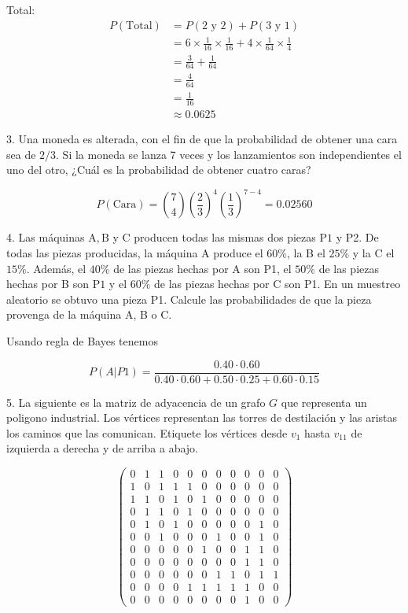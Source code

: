 \documentclass{report}
\begin{document}
Total:
\begin{align*}
    P(\text{Total}) &= P(\text{2 y 2}) + P(\text{3 y 1}) \\
    &= 6 \times \frac{1}{16} \times \frac{1}{16} + 4 \times \frac{1}{64} \times \frac{1}{4} \\
    &= \frac{3}{64} + \frac{1}{64} \\
    &= \frac{4}{64} \\
    &= \frac{1}{16} \\
    &\approx 0.0625
\end{align*}
    

3. Una moneda es alterada, con el fin de que la probabilidad de obtener una cara sea de $2 / 3$. Si la moneda se lanza 7 veces y los lanzamientos son independientes el uno del otro, ¿Cuál es la probabilidad de obtener cuatro caras?

$$P(\text{Cara}) = \binom{7}{4} \left(\frac{2}{3}\right)^4 \left(\frac{1}{3}\right)^{7-4} = 0.02560$$

4. Las máquinas $\mathrm{A}, \mathrm{B}$ y $\mathrm{C}$ producen todas las mismas dos piezas $\mathrm{P} 1$ y P2. De todas las piezas producidas, la máquina A produce el $60 \%$, la B el $25 \%$ y la C el $15 \%$. Además, el $40 \%$ de las piezas hechas por A son P1, el $50 \%$ de las piezas hechas por B son $\mathrm{P} 1$ y el $60 \%$ de las piezas hechas por C son P1. En un muestreo aleatorio se obtuvo una pieza P1. Calcule las probabilidades de que la pieza provenga de la máquina A, B o C.

Usando regla de Bayes tenemos

$$P(A|P1) = \frac{0.40 \cdot 0.60}{0.40 \cdot 0.60 + 0.50 \cdot 0.25 + 0.60 \cdot 0.15}$$

5. La siguiente es la matriz de adyacencia de un grafo $G$ que representa un poligono industrial. Los vértices representan las torres de destilación y las aristas los caminos que las comunican. Etiquete los vértices desde $v_{1}$ hasta $v_{11}$ de izquierda a derecha y de arriba a abajo.

$$
\left(\begin{array}{lllllllllll}
0 & 1 & 1 & 0 & 0 & 0 & 0 & 0 & 0 & 0 & 0 \\
1 & 0 & 1 & 1 & 1 & 0 & 0 & 0 & 0 & 0 & 0 \\
1 & 1 & 0 & 1 & 0 & 1 & 0 & 0 & 0 & 0 & 0 \\
0 & 1 & 1 & 0 & 1 & 0 & 0 & 0 & 0 & 0 & 0 \\
0 & 1 & 0 & 1 & 0 & 0 & 0 & 0 & 0 & 1 & 0 \\
0 & 0 & 1 & 0 & 0 & 0 & 1 & 0 & 0 & 1 & 0 \\
0 & 0 & 0 & 0 & 0 & 1 & 0 & 0 & 1 & 1 & 0 \\
0 & 0 & 0 & 0 & 0 & 0 & 0 & 0 & 1 & 1 & 0 \\
0 & 0 & 0 & 0 & 0 & 0 & 1 & 1 & 0 & 1 & 1 \\
0 & 0 & 0 & 0 & 1 & 1 & 1 & 1 & 1 & 0 & 0 \\
0 & 0 & 0 & 0 & 0 & 0 & 0 & 0 & 1 & 0 & 0
\end{array}\right)
$$
\end{document}
